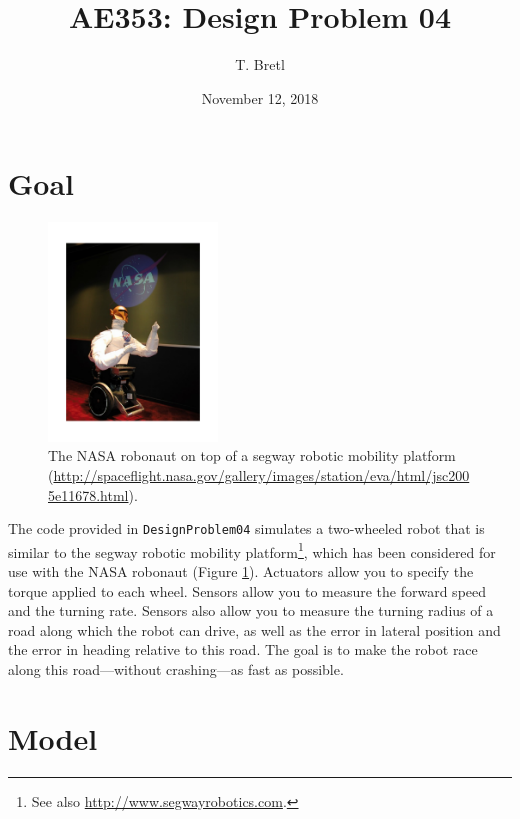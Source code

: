 \documentclass[12pt]{article}
\title{AE353: Design Problem 04}
\author{T. Bretl}
\date{November 12, 2018}
\begin{document}
\maketitle


\section{Goal}

\begin{figure}
\vspace{-6em}%
\includegraphics[width=0.4\textwidth]{robonaut}
\vspace{-3em}
\caption{The NASA robonaut on top of a segway robotic mobility platform (\url{http://spaceflight.nasa.gov/gallery/images/station/eva/html/jsc2005e11678.html}). \label{figRobonaut}}
\end{figure}

The code provided in \lstinline!DesignProblem04! simulates a two-wheeled robot that is similar to the segway robotic mobility platform\footnote{See also \url{http://www.segwayrobotics.com}.}, which has been considered for use with the NASA robonaut (Figure \ref{figRobonaut}). Actuators allow you to specify the torque applied to each wheel. Sensors allow you to measure the forward speed and the turning rate. Sensors also allow you to measure the turning radius of a road along which the robot can drive, as well as the error in lateral position and the error in heading relative to this road. The goal is to make the robot race along this road---without crashing---as fast as possible.

\section{Model}
\end{document}
